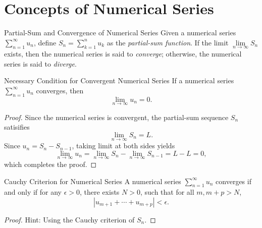 
\section{Concepts of Numerical Series}

\begin{definition}{Partial-Sum and Convergence of Numerical Series}{}
  Given a numerical series $\sum\limits_{n = 1}^{\infty}u_n$,
  define $S_n = \sum\limits_{k = 1}^n u_k$ as the \emph{partial-sum function}.
  If the limit $\lim \limits _{n \rightarrow \infty} S_n$ exists,
  then the numerical series is said to \emph{converge};
  otherwise, the numerical series is said to \emph{diverge}.
\end{definition}

\begin{proposition}{Necessary Condition for Convergent Numerical Series}{}
  If a numerical series $\sum\limits_{n = 1}^{\infty}u_n$ converges,
  then
  \begin{equation}
    \lim \limits _{n \rightarrow \infty} u_n = 0.
  \end{equation}
\end{proposition}

\begin{proof}
  Since the numerical series is convergent, the partial-sum sequence $S_n$ satisifies
  \begin{equation}
    \lim \limits _{n \rightarrow \infty} S_n = L.
  \end{equation}
  Since $u_n = S_n - S_{n-1}$, taking limit at both sides yields
  \begin{equation}
    \lim \limits _{n \rightarrow \infty} u_n = \lim \limits _{n \rightarrow \infty} S_n - \lim \limits _{n \rightarrow \infty} S_{n-1}
    = L - L = 0,
  \end{equation}
  which completes the proof.
\end{proof}

\begin{proposition}{Cauchy Criterion for Numerical Series}{}
  A numerical series $\sum\limits_{n = 1}^{\infty} u_n$ converges if and only if
  for any $\epsilon > 0$, there exists $N > 0$, such that for all $m, m+p > N$,
  \begin{equation}
    |u_{m+1} + \cdots + u_{m+p}| < \epsilon.
  \end{equation}
\end{proposition}

\begin{proof}
  Hint: Using the Cauchy criterion of $S_n$.
\end{proof}

